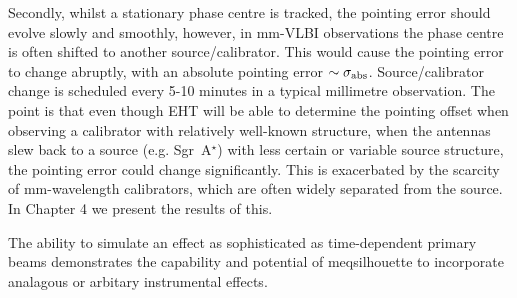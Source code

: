 Secondly, whilst a stationary phase centre is tracked, the pointing error should evolve slowly and smoothly, however, in mm-VLBI observations the phase centre is often shifted to another source/calibrator. This would cause the pointing error to change abruptly, with an absolute pointing error $\sim \sigma_{\rm abs}$. Source/calibrator change is scheduled every 5-10 minutes in a typical millimetre observation. The point is that even though EHT will be able to determine the pointing offset when observing a calibrator with relatively well-known structure, when the antennas slew back to a source (e.g. Sgr~A$^\star$) with less certain or variable source structure, the pointing error could change significantly. This is exacerbated by the scarcity of mm-wavelength calibrators, which are often widely separated from the source. In Chapter 4 we present the results of this.


The ability to simulate an effect as sophisticated as time-dependent primary beams demonstrates the capability and potential of {\sc meqsilhouette} to incorporate analagous or arbitary instrumental effects. 
